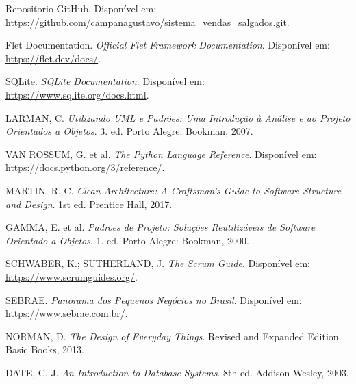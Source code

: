 \documentclass[conference]{IEEEtran}
\begin{document}
\begin{thebibliography}{9}

Repositorio GitHub. 
Disponível em: \url{https://github.com/campanagustavo/sistema_vendas_salgados.git}. 


Flet Documentation. 
\textit{Official Flet Framework Documentation}. 
Disponível em: \url{https://flet.dev/docs/}. 

SQLite. 
\textit{SQLite Documentation}. 
Disponível em: \url{https://www.sqlite.org/docs.html}. 

LARMAN, C. 
\textit{Utilizando UML e Padrões: Uma Introdução à Análise e ao Projeto Orientados a Objetos}. 
3. ed. Porto Alegre: Bookman, 2007.

VAN ROSSUM, G. et al. 
\textit{The Python Language Reference}. 
Disponível em: \url{https://docs.python.org/3/reference/}. 

MARTIN, R. C. 
\textit{Clean Architecture: A Craftsman's Guide to Software Structure and Design}. 
1st ed. Prentice Hall, 2017.

GAMMA, E. et al. 
\textit{Padrões de Projeto: Soluções Reutilizáveis de Software Orientado a Objetos}. 
1. ed. Porto Alegre: Bookman, 2000.

SCHWABER, K.; SUTHERLAND, J. 
\textit{The Scrum Guide}. 
Disponível em: \url{https://www.scrumguides.org/}. 

SEBRAE. 
\textit{Panorama dos Pequenos Negócios no Brasil}. 
Disponível em: \url{https://www.sebrae.com.br/}. 

NORMAN, D. 
\textit{The Design of Everyday Things}. 
Revised and Expanded Edition. Basic Books, 2013.

DATE, C. J. 
\textit{An Introduction to Database Systems}. 
8th ed. Addison-Wesley, 2003.

\end{thebibliography}
\end{document}
